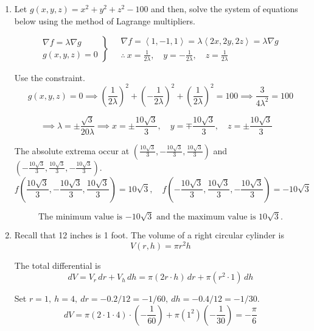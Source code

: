\documentclass[a4paper, 12pt]{article}
\renewcommand{\headrulewidth}{0pt}
\begin{document}
\newpage
\pagestyle{fancy}
\renewcommand{\headrulewidth}{1pt}


\begin{enumerate}[leftmargin=*,label=\textbf{\arabic*.}]
\item Let $g(x,y,z)=x^2+y^2+z^2-100$ and then, solve the system of equations below using the method of Lagrange multipliers.

\[
\left.
\begin{array}{l}
\displaystyle\nabla f=\lambda\nabla g\\
\displaystyle g(x,y,z)=0
\end{array}
\right\}\quad\begin{array}{c}
\nabla f=\left\langle1,-1,1\right\rangle=\lambda\left\langle2x,2y,2z\right\rangle=\lambda\nabla g\\[1em]\displaystyle\therefore\: x=\frac1{2\lambda},\quad y=-\frac1{2\lambda},\quad z=\frac1{2\lambda}
\end{array}
\]

Use the constraint.
\[g(x,y,z)=0\implies\left(\frac1{2\lambda}\right)^2+\left(-\frac1{2\lambda}\right)^2+\left(\frac1{2\lambda}\right)^2=100\implies\frac3{4\lambda^2}=100\]

\[\implies\lambda=\pm\frac{\sqrt3}{20\lambda}\implies x=\pm\frac{10\sqrt3}3,\quad y=\mp\frac{10\sqrt3}3,\quad z=\pm\frac{10\sqrt3}3\quad\]

The absolute extrema occur at $\left(\frac{10\sqrt3}3,-\frac{10\sqrt3}3,\frac{10\sqrt3}3\right)$ and $\left(-\frac{10\sqrt3}3,\frac{10\sqrt3}3,-\frac{10\sqrt3}3\right)$.
\[f\left(\frac{10\sqrt3}3,-\frac{10\sqrt3}3,\frac{10\sqrt3}3\right)=10\sqrt3,\quad f\left(-\frac{10\sqrt3}3,\frac{10\sqrt3}3,-\frac{10\sqrt3}3\right)=-10\sqrt3\]

\[\boxed{\text{The minimum value is }{-10\sqrt3}\text{ and the maximum value is }10\sqrt3.}\]

\item Recall that 12 inches is 1 foot. The volume of a right circular cylinder is
\[V(r,h)=\pi r^2 h\]

The total differential is
\[dV=V_r\,dr+V_h\,dh=\pi\left(2r\cdot h\right)\,dr+\pi\left(r^2\cdot 1\right)\,dh\]

Set $r=1,\:h=4,\:dr=-0.2/12=-1/60,\:dh=-0.4/12=-1/30$.
\[dV=\pi\left(2\cdot1\cdot 4\right)\cdot\left(-\frac1{60}\right)+\pi\left(1^2\right)\left(-\frac1{30}\right)=-\frac\pi6\]


\end{enumerate}
\end{document}
